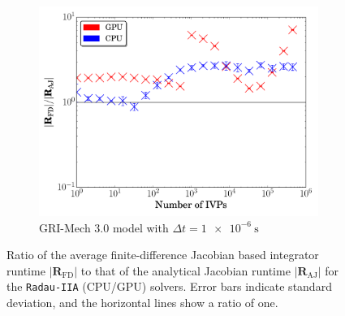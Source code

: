 \documentclass[preprint,review,11pt]{elsarticle}
\begin{document}
\begin{figure}[htbp]
\begin{subfigure}{0.49\textwidth}
      \includegraphics[width=\linewidth]{CH4_1e-06_ajac_comp.pdf}
      \caption{GRI-Mech 3.0 model with $\Delta t = \SI{1e-6}{\second}$}
      \label{F:AJ_ch4_small}
  \end{subfigure}
  \caption{Ratio of the average finite-difference Jacobian based integrator runtime $\lvert\textbf{R}_{\text{FD}}\rvert$ to that of the analytical Jacobian runtime $\lvert\textbf{R}_{\text{AJ}}\rvert$ for the \texttt{Radau-IIA} (CPU\slash GPU) solvers.
  Error bars indicate standard deviation, and the horizontal lines show a ratio of one.}
  \label{F:AJ_comp}
\end{figure}

%
\end{document}
